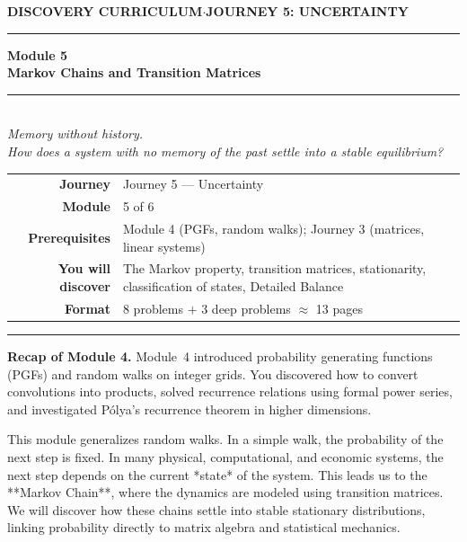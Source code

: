 \documentclass[12pt, a4paper]{article}
\newcounter{problem}
\begin{document}
\thispagestyle{empty}
\begin{center}
{\small\color{MidBlue}\textbf{DISCOVERY CURRICULUM}\quad$\cdot$\quad\textbf{JOURNEY 5: UNCERTAINTY}}
\vspace{0.6cm}

{\color{NavyBlue}\rule{\linewidth}{2pt}}\vspace{0.5cm}

{\Huge\bfseries\color{NavyBlue}Module 5}\\[0.3cm]
{\LARGE\bfseries\color{MidBlue}Markov Chains and Transition Matrices}\\[0.4cm]
{\color{Gold}\rule{0.4\linewidth}{1.2pt}}\\[0.4cm]
{\large\itshape\color{DarkGrey}
Memory without history.\\[0.15cm]
How does a system with no memory of the past settle into a stable equilibrium?}

\vspace{1cm}
\begin{tabular}{rl}
\color{DarkGrey}\textbf{Journey}           & Journey 5 --- Uncertainty \\[4pt]
\color{DarkGrey}\textbf{Module}            & 5 of 6 \\[4pt]
\color{DarkGrey}\textbf{Prerequisites}     & Module 4 (PGFs, random walks); Journey 3 (matrices, linear systems) \\[4pt]
\color{DarkGrey}\textbf{You will discover} & The Markov property, transition matrices, stationarity, classification of states, Detailed Balance \\[4pt]
\color{DarkGrey}\textbf{Format}            & 8 problems $+$ 3 deep problems $\approx$ 13 pages \\
\end{tabular}
\vspace{1cm}

{\color{NavyBlue}\rule{\linewidth}{2pt}}
\end{center}

\vspace{0.5cm}
\noindent\textbf{Recap of Module 4.}
Module~4 introduced probability generating functions (PGFs) and random walks on integer grids. You discovered how to convert convolutions into products, solved recurrence relations using formal power series, and investigated Pólya's recurrence theorem in higher dimensions.

\medskip
This module generalizes random walks. In a simple walk, the probability of the next step is fixed. In many physical, computational, and economic systems, the next step depends on the current *state* of the system. This leads us to the **Markov Chain**, where the dynamics are modeled using transition matrices. We will discover how these chains settle into stable stationary distributions, linking probability directly to matrix algebra and statistical mechanics.
\end{document}
